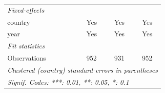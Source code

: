\begin{table}[htbp]
\begin{tabular}{lccc}
      \midrule
      \emph{Fixed-effects}\\
      country              & Yes                  & Yes                        & Yes\\  
      year                 & Yes                  & Yes                        & Yes\\  
      \midrule
      \emph{Fit statistics}\\
      Observations         & 952                  & 931                        & 952\\  
      \midrule \midrule
      \multicolumn{4}{l}{\emph{Clustered (country) standard-errors in parentheses}}\\
      \multicolumn{4}{l}{\emph{Signif. Codes: ***: 0.01, **: 0.05, *: 0.1}}\\
   \end{tabular}
\end{table}
